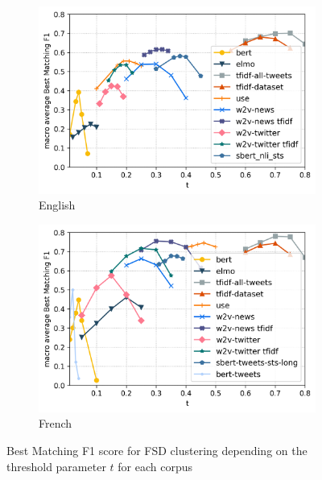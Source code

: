 \begin{figure}
\centering
\begin{subfigure}{.5\textwidth}
  \centering
  \includegraphics[width=1\linewidth]{figures/graph_en_FSD.png}
  \caption{English}
  \label{fig: graph_FSD_en}
\end{subfigure}%
\begin{subfigure}{.5\textwidth}
  \centering
  \includegraphics[width=1\linewidth]{figures/graph_fr_FSD.png}
  \caption{French}
  \label{fig: graph_FSD_fr}
\end{subfigure}
\caption{Best Matching F1 score for FSD clustering depending on the
threshold parameter $t$ for each corpus}
\label{fig: graph_FSD}
\end{figure}

